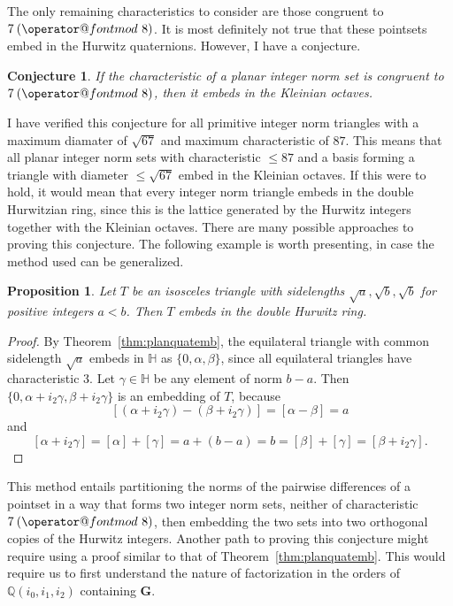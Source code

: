 \documentclass[10pt]{amsart}
\makeatletter
\newcommand{\Q}{\mathbb{Q}}
\renewcommand{\H}{\mathbb{H}}
\newcommand{\G}{\mathbf{G}}
\newcommand{\norm}[1]{\left[#1\right]}
\newtheorem{prop}[thm]{Proposition}
\newtheorem{conj}[thm]{Conjecture}
\DeclareRobustCommand{\pmod}{\@pmods}
\def\@pmods#1{\mkern4mu({\operator@font mod}\mkern 6mu#1)}
\makeatother
\begin{document}
The only remaining characteristics to consider are those congruent to $7 \pmod{8}$.  It is most definitely not true that these pointsets embed in the Hurwitz quaternions.  However, I have a conjecture.

\begin{conj}
\normalfont
If the characteristic of a planar integer norm set is congruent to $7 \pmod{8}$, then it embeds in the Kleinian octaves.
\end{conj}
I have verified this conjecture for all primitive integer norm triangles with a maximum diamater of $\sqrt{67}$ and maximum characteristic of $87$.  This means that all planar integer norm sets with characteristic $\leq 87$ and a basis forming a triangle with diameter $\leq \sqrt{67}$ embed in the Kleinian octaves. If this were to hold, it would mean that every integer norm triangle embeds in the double Hurwitzian ring, since this is the lattice generated by the Hurwitz integers together with the Kleinian octaves.  There are many possible approaches to proving this conjecture.  The following example is worth presenting, in case the method used can be generalized.

\begin{prop}
\normalfont
Let $T$ be an isosceles triangle with sidelengths $\sqrt{a}, \sqrt{b}, \sqrt{b}$ for positive integers $a < b$.  Then $T$ embeds in the double Hurwitz ring.
\end{prop}

\begin{proof}
By Theorem~\ref{thm:planquatemb}, the equilateral triangle with common sidelength $\sqrt{a}$ embeds in $\H$ as $\{0,\alpha, \beta\}$, since all equilateral triangles have characteristic 3.  Let $\gamma \in \H$ be any element of norm $b - a$.  Then $\{0, \alpha + i_2 \gamma, \beta + i_2\gamma\}$ is an embedding of $T$, because
$$
\norm{(\alpha + i_2\gamma) - (\beta + i_2\gamma)} = \norm{\alpha - \beta} = a
$$
and
$$
\norm{\alpha + i_2\gamma} = \norm{\alpha} + \norm{\gamma} = a + (b-a) = b = \norm{\beta} + \norm{\gamma} = \norm{\beta + i_2\gamma}.
$$
\end{proof}

This method entails partitioning the norms of the pairwise differences of a pointset in a way that forms two integer norm sets, neither of characteristic $7 \pmod{8}$, then embedding the two sets into two orthogonal copies of the Hurwitz integers.  Another path to proving this conjecture might require using a proof similar to that of Theorem~\ref{thm:planquatemb}.  This would require us to first understand the nature of factorization in the orders of $\Q(i_0,i_1,i_2)$ containing $\G$.
\end{document}
